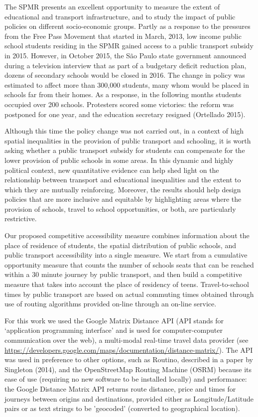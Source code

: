\documentclass[3p,authoryear,preprint,review,12pt]{elsarticle}
\begin{document}
The SPMR presents an excellent opportunity to measure the extent of
educational and transport infrastructure, and to study the impact of
public policies on different socio-economic groups. Partly as a response to the pressures from the Free Pass Movement that started in March, 2013, low income public school students residing in the SPMR gained access to a public transport subsidy in 2015. However, in October 2015, the São Paulo state government announced during a television interview that as part of a budgetary deficit reduction plan, dozens of secondary schools would be closed in 2016. The change in policy was estimated to affect more than 300,000 students, many whom would be placed in schools far from their homes. As a response, in the following months students occupied over 200 schools. Protesters scored some victories: the reform was postponed for one year, and the education secretary resigned (Ortellado 2015).

Although this time the policy change was not carried out, in a context of high spatial inequalities in the provision of public transport and schooling, it is worth asking whether a public transport subsidy for students can compensate for the lower provision of public schools in some areas. In this dynamic and highly political context, new quantitative evidence can help shed light on the relationship between transport and educational inequalities and the extent to which they are mutually reinforcing. Moreover, the results should help design policies that are more inclusive and equitable by highlighting areas where the
provision of schools, travel to school opportunities, or both, are
particularly restrictive.

Our proposed competitive accessibility measure combines information
about the place of residence of students, the spatial distribution of public schools, and public transport accessibility into a single
measure. We start from a cumulative opportunity measure that counts the number of schools seats that can be reached within a 30 minute journey by public transport, and then build a competitive measure that takes into account the place of residency of teens. Travel-to-school times by public transport are based on actual commuting times obtained through use of routing algorithms provided on-line through an on-line service. 

For this work we used the Google Matrix Distance API
(API stands for `application programming interface' and is used for
computer-computer communication over the web), a multi-modal
real-time travel data provider (see \url{https://developers.google.com/maps/documentation/distance-matrix/}). 
The API was used in preference to other options,
such as Routino, described in a paper by Singleton (2014),
and the OpenStreetMap Routing Machine (OSRM)
because its
ease of use (requiring no new software to be installed locally)
and performance: the Google Distance Matrix
API returns
route distance, price and times for journeys between origins and
destinations, provided either as Longitude/Latitude pairs or
as text strings to be 'geocoded' (converted to geographical location).
\end{document}
